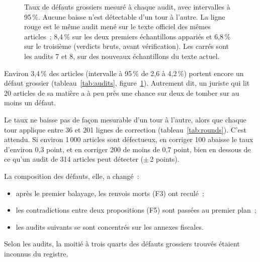 \documentclass[11pt,a4paper]{article}
\begin{document}
\begin{figure}[ht]
\centering
{}
\caption{Taux de défauts grossiers mesuré à chaque audit, avec intervalles à 95\,\%. Aucune baisse n'est détectable d'un tour à l'autre. La ligne rouge est le même audit mené sur le texte officiel des mêmes articles~; 8,4\,\% sur les deux premiers échantillons appariés et 6,8\,\% sur le troisième (verdicts bruts, avant vérification). Les carrés sont les audits 7 et 8, sur des nouveaux échantillons du texte actuel.}
\label{fig:audits}
\end{figure}

Environ 3,4\,\% des articles (intervalle à 95\,\% de 2,6 à 4,2\,\%) portent encore un défaut grossier (tableau~\ref{tab:audits}, figure~\ref{fig:audits}). Autrement dit, un juriste qui lit 20 articles de sa matière a à peu près une chance sur deux de tomber sur au moins un défaut.

Le taux ne baisse pas de façon mesurable d'un tour à l'autre, alors que chaque tour applique entre 36 et 201 lignes de correction (tableau~\ref{tab:rounds}). C'est attendu. Si environ 1\,000 articles sont défectueux, en corriger 100 abaisse le taux d'environ 0,3 point, et en corriger 200 de moins de 0,7 point, bien en dessous de ce qu'un audit de 314 articles peut détecter ($\pm$\,2 points).

La composition des défauts, elle, a changé~:
\begin{itemize}
  \item après le premier balayage, les renvois morts (F3) ont reculé~;
  \item les contradictions entre deux propositions (F5) sont passées au premier plan~;
  \item les audits suivants se sont concentrés sur les annexes fiscales.
\end{itemize}
Selon les audits, la moitié à trois quarts des défauts grossiers trouvés étaient inconnus du registre.
\end{document}
